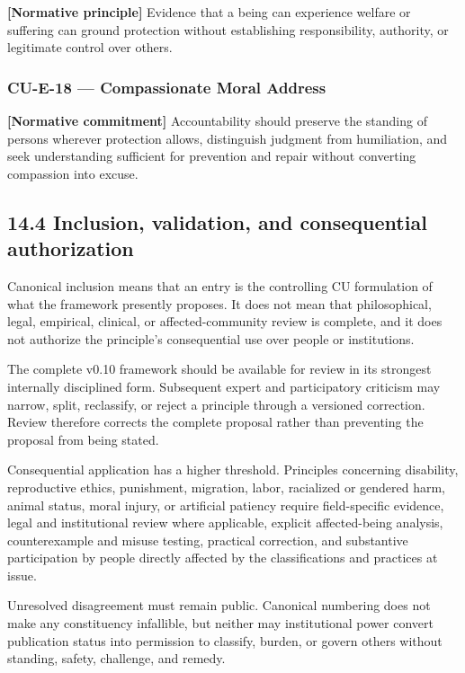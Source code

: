 \documentclass[
  11pt,
]{article}
\begin{document}
\textbf{{[}Normative principle{]}} Evidence that a being can experience
welfare or suffering can ground protection without establishing
responsibility, authority, or legitimate control over others.

\subsubsection{CU-E-18 --- Compassionate Moral
Address}\label{cu-e-18-compassionate-moral-address}

\textbf{{[}Normative commitment{]}} Accountability should preserve the
standing of persons wherever protection allows, distinguish judgment
from humiliation, and seek understanding sufficient for prevention and
repair without converting compassion into excuse.

\subsection{14.4 Inclusion, validation, and consequential
authorization}\label{inclusion-validation-and-consequential-authorization}

Canonical inclusion means that an entry is the controlling CU
formulation of what the framework presently proposes. It does not mean
that philosophical, legal, empirical, clinical, or affected-community
review is complete, and it does not authorize the principle's
consequential use over people or institutions.

The complete v0.10 framework should be available for review in its
strongest internally disciplined form. Subsequent expert and
participatory criticism may narrow, split, reclassify, or reject a
principle through a versioned correction. Review therefore corrects the
complete proposal rather than preventing the proposal from being stated.

Consequential application has a higher threshold. Principles concerning
disability, reproductive ethics, punishment, migration, labor,
racialized or gendered harm, animal status, moral injury, or artificial
patiency require field-specific evidence, legal and institutional review
where applicable, explicit affected-being analysis, counterexample and
misuse testing, practical correction, and substantive participation by
people directly affected by the classifications and practices at issue.

Unresolved disagreement must remain public. Canonical numbering does not
make any constituency infallible, but neither may institutional power
convert publication status into permission to classify, burden, or
govern others without standing, safety, challenge, and remedy.
\end{document}
